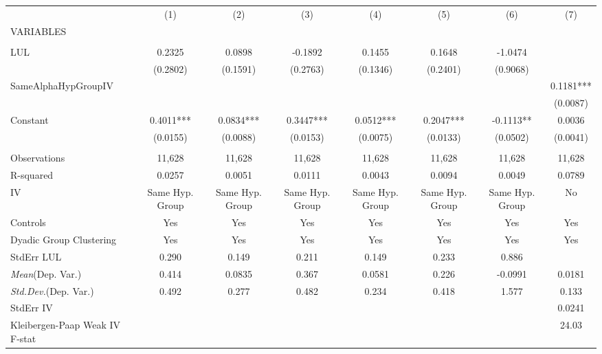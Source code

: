 \documentclass[]{article}
\begin{document}
\begin{tabular}{lccccccc} \hline
 & (1) & (2) & (3) & (4) & (5) & (6) & (7) \\
VARIABLES &  &  &  &  &  &  &  \\ \hline
 &  &  &  &  &  &  &  \\
LUL & 0.2325 & 0.0898 & -0.1892 & 0.1455 & 0.1648 & -1.0474 &  \\
 & (0.2802) & (0.1591) & (0.2763) & (0.1346) & (0.2401) & (0.9068) &  \\
SameAlphaHypGroupIV &  &  &  &  &  &  & 0.1181*** \\
 &  &  &  &  &  &  & (0.0087) \\
Constant & 0.4011*** & 0.0834*** & 0.3447*** & 0.0512*** & 0.2047*** & -0.1113** & 0.0036 \\
 & (0.0155) & (0.0088) & (0.0153) & (0.0075) & (0.0133) & (0.0502) & (0.0041) \\
 &  &  &  &  &  &  &  \\
Observations & 11,628 & 11,628 & 11,628 & 11,628 & 11,628 & 11,628 & 11,628 \\
R-squared & 0.0257 & 0.0051 & 0.0111 & 0.0043 & 0.0094 & 0.0049 & 0.0789 \\
IV & Same Hyp. Group & Same Hyp. Group & Same Hyp. Group & Same Hyp. Group & Same Hyp. Group & Same Hyp. Group & No \\
Controls & Yes & Yes & Yes & Yes & Yes & Yes & Yes \\
Dyadic Group Clustering & Yes & Yes & Yes & Yes & Yes & Yes & Yes \\
StdErr LUL & 0.290 & 0.149 & 0.211 & 0.149 & 0.233 & 0.886 &  \\
\textit{Mean}(Dep. Var.) & 0.414 & 0.0835 & 0.367 & 0.0581 & 0.226 & -0.0991 & 0.0181 \\
\textit{Std.Dev.}(Dep. Var.) & 0.492 & 0.277 & 0.482 & 0.234 & 0.418 & 1.577 & 0.133 \\
StdErr IV &  &  &  &  &  &  & 0.0241 \\
 Kleibergen-Paap Weak IV F-stat &  &  &  &  &  &  & 24.03 \\ \hline
\end{tabular}
\end{document}
